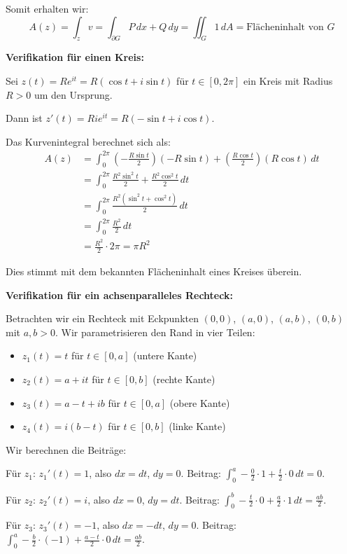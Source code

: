 \documentclass{article}
\begin{document}
Somit erhalten wir:
$$A(z) = \int_z v = \int_{\partial G} P\,dx + Q\,dy = \iint_G 1\,dA = \text{Flächeninhalt von } G$$

\textbf{Verifikation für einen Kreis:}

Sei $z(t) = Re^{it} = R(\cos t + i\sin t)$ für $t \in [0, 2\pi]$ ein Kreis mit Radius $R > 0$ um den Ursprung.

Dann ist $z'(t) = Ri e^{it} = R(-\sin t + i\cos t)$.

Das Kurvenintegral berechnet sich als:
\begin{align}
A(z) &= \int_0^{2\pi} \left(-\frac{R\sin t}{2}\right)(-R\sin t) + \left(\frac{R\cos t}{2}\right)(R\cos t) \,dt\\
&= \int_0^{2\pi} \frac{R^2\sin^2 t}{2} + \frac{R^2\cos^2 t}{2} \,dt\\
&= \int_0^{2\pi} \frac{R^2(\sin^2 t + \cos^2 t)}{2} \,dt\\
&= \int_0^{2\pi} \frac{R^2}{2} \,dt\\
&= \frac{R^2}{2} \cdot 2\pi = \pi R^2
\end{align}

Dies stimmt mit dem bekannten Flächeninhalt eines Kreises überein.

\textbf{Verifikation für ein achsenparalleles Rechteck:}

Betrachten wir ein Rechteck mit Eckpunkten $(0,0)$, $(a,0)$, $(a,b)$, $(0,b)$ mit $a,b > 0$. Wir parametrisieren den Rand in vier Teilen:

\begin{itemize}
\item $z_1(t) = t$ für $t \in [0,a]$ (untere Kante)
\item $z_2(t) = a + it$ für $t \in [0,b]$ (rechte Kante) 
\item $z_3(t) = a-t + ib$ für $t \in [0,a]$ (obere Kante)
\item $z_4(t) = i(b-t)$ für $t \in [0,b]$ (linke Kante)
\end{itemize}

Wir berechnen die Beiträge:

Für $z_1$: $z_1'(t) = 1$, also $dx = dt$, $dy = 0$. Beitrag: $\int_0^a -\frac{0}{2} \cdot 1 + \frac{t}{2} \cdot 0 \,dt = 0$.

Für $z_2$: $z_2'(t) = i$, also $dx = 0$, $dy = dt$. Beitrag: $\int_0^b -\frac{t}{2} \cdot 0 + \frac{a}{2} \cdot 1 \,dt = \frac{ab}{2}$.

Für $z_3$: $z_3'(t) = -1$, also $dx = -dt$, $dy = 0$. Beitrag: $\int_0^a -\frac{b}{2} \cdot (-1) + \frac{a-t}{2} \cdot 0 \,dt = \frac{ab}{2}$.
\end{document}
